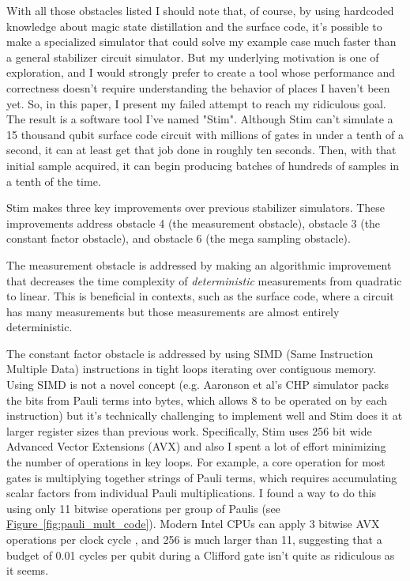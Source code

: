 \documentclass[onecolumn,unpublished]{quantumarticle}
\theoremstyle{definition}
\theoremstyle{definition}
\theoremstyle{definition}
\newcommand{\fig}[1]{\hyperref[fig:#1]{Figure~\ref*{fig:#1}}}
\begin{document}
With all those obstacles listed I should note that, of course, by using hardcoded knowledge about magic state distillation and the surface code, it's possible to make a specialized simulator that could solve my example case much faster than a general stabilizer circuit simulator.
But my underlying motivation is one of exploration, and I would strongly prefer to create a tool whose performance and correctness doesn't require understanding the behavior of places I haven't been yet.
So, in this paper, I present my failed attempt to reach my ridiculous goal.
The result is a software tool I've named "Stim".
Although Stim can't simulate a 15 thousand qubit surface code circuit with millions of gates in under a tenth of a second, it can at least get that job done in roughly ten seconds.
Then, with that initial sample acquired, it can begin producing batches of hundreds of samples in a tenth of the time.

Stim makes three key improvements over previous stabilizer simulators.
These improvements address obstacle 4 (the measurement obstacle), obstacle 3 (the constant factor obstacle), and obstacle 6 (the mega sampling obstacle).

The measurement obstacle is addressed by making an algorithmic improvement that decreases the time complexity of {\em deterministic} measurements from quadratic to linear.
This is beneficial in contexts, such as the surface code, where a circuit has many measurements but those measurements are almost entirely deterministic.

The constant factor obstacle is addressed by using SIMD (Same Instruction Multiple Data) instructions in tight loops iterating over contiguous memory.
Using SIMD is not a novel concept (e.g. Aaronson et al's CHP simulator \cite{aaronson2004chp} packs the bits from Pauli terms into bytes, which allows 8 to be operated on by each instruction) but it's technically challenging to implement well and Stim does it at larger register sizes than previous work.
Specifically, Stim uses 256 bit wide Advanced Vector Extensions (AVX) \cite{wiki:Advanced_Vector_Extensions} and also I spent a lot of effort minimizing the number of operations in key loops.
For example, a core operation for most gates is multiplying together strings of Pauli terms, which requires accumulating scalar factors from individual Pauli multiplications.
I found a way to do this using only 11 bitwise operations per group of Paulis (see \fig{pauli_mult_code}).
Modern Intel CPUs can apply 3 bitwise AVX operations per clock cycle \cite{intel-intrinsics-and}, and 256 is much larger than 11, suggesting that a budget of 0.01 cycles per qubit during a Clifford gate isn't quite as ridiculous as it seems.
\end{document}
